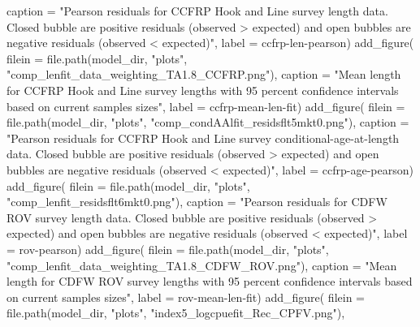 \documentclass[
  letterpaper,
]{article}
\newenvironment{Shaded}{\begin{snugshade}}{\end{snugshade}}
\newcommand{\AttributeTok}[1]{\textcolor[rgb]{0.77,0.63,0.00}{#1}}
\newcommand{\FunctionTok}[1]{\textcolor[rgb]{0.00,0.00,0.00}{#1}}
\newcommand{\NormalTok}[1]{#1}
\newcommand{\StringTok}[1]{\textcolor[rgb]{0.31,0.60,0.02}{#1}}
\begin{document}
\begin{Shaded}
\begin{Highlighting}[]
\AttributeTok{caption =} \StringTok{"Pearson residuals for CCFRP Hook and Line survey length data. Closed bubble are positive residuals (observed \textgreater{} expected) and open bubbles are negative residuals (observed \textless{} expected)"}\NormalTok{,}
\AttributeTok{label =} \StringTok{\textquotesingle{}ccfrp{-}len{-}pearson\textquotesingle{}}\NormalTok{)}
\FunctionTok{add\_figure}\NormalTok{(}
\AttributeTok{filein =} \FunctionTok{file.path}\NormalTok{(model\_dir, }\StringTok{"plots"}\NormalTok{, }\StringTok{"comp\_lenfit\_data\_weighting\_TA1.8\_CCFRP.png"}\NormalTok{), }
\AttributeTok{caption =} \StringTok{"Mean length for CCFRP Hook and Line survey lengths with 95 percent confidence intervals based on current samples sizes"}\NormalTok{,}
\AttributeTok{label =} \StringTok{\textquotesingle{}ccfrp{-}mean{-}len{-}fit\textquotesingle{}}\NormalTok{)}
\FunctionTok{add\_figure}\NormalTok{(}
\AttributeTok{filein =} \FunctionTok{file.path}\NormalTok{(model\_dir, }\StringTok{"plots"}\NormalTok{, }\StringTok{"comp\_condAAlfit\_residsflt5mkt0.png"}\NormalTok{), }
\AttributeTok{caption =} \StringTok{"Pearson residuals for CCFRP Hook and Line survey conditional{-}age{-}at{-}length data. Closed bubble are positive residuals (observed \textgreater{} expected) and open bubbles are negative residuals (observed \textless{} expected)"}\NormalTok{,}
\AttributeTok{label =} \StringTok{\textquotesingle{}ccfrp{-}age{-}pearson\textquotesingle{}}\NormalTok{)}
\FunctionTok{add\_figure}\NormalTok{(}
\AttributeTok{filein =} \FunctionTok{file.path}\NormalTok{(model\_dir, }\StringTok{"plots"}\NormalTok{, }\StringTok{"comp\_lenfit\_residsflt6mkt0.png"}\NormalTok{), }
\AttributeTok{caption =} \StringTok{"Pearson residuals for CDFW ROV survey length data. Closed bubble are positive residuals (observed \textgreater{} expected) and open bubbles are negative residuals (observed \textless{} expected)"}\NormalTok{,}
\AttributeTok{label =} \StringTok{\textquotesingle{}rov{-}pearson\textquotesingle{}}\NormalTok{)}
\FunctionTok{add\_figure}\NormalTok{(}
\AttributeTok{filein =} \FunctionTok{file.path}\NormalTok{(model\_dir, }\StringTok{"plots"}\NormalTok{, }\StringTok{"comp\_lenfit\_data\_weighting\_TA1.8\_CDFW\_ROV.png"}\NormalTok{), }
\AttributeTok{caption =} \StringTok{"Mean length for CDFW ROV survey lengths with 95 percent confidence intervals based on current samples sizes"}\NormalTok{,}
\AttributeTok{label =} \StringTok{\textquotesingle{}rov{-}mean{-}len{-}fit\textquotesingle{}}\NormalTok{)}
\FunctionTok{add\_figure}\NormalTok{(}
\AttributeTok{filein =} \FunctionTok{file.path}\NormalTok{(model\_dir, }\StringTok{"plots"}\NormalTok{, }\StringTok{"index5\_logcpuefit\_Rec\_CPFV.png"}\NormalTok{), }

\end{Highlighting}
\end{Shaded}
\end{document}
